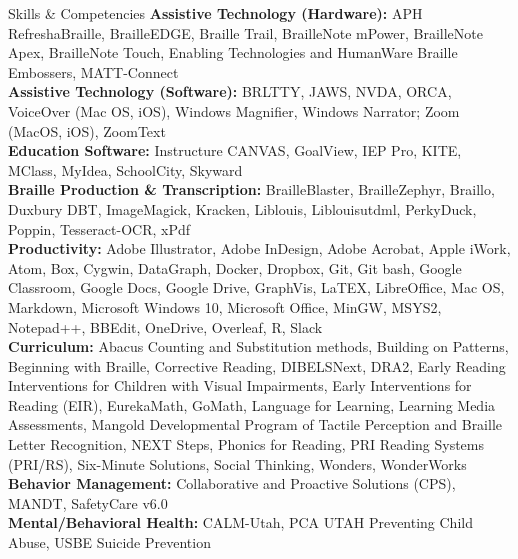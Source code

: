 \documentclass{resume} %
\begin{document}
\begin{rSection}{Skills \& Competencies}
	\textbf{Assistive Technology (Hardware):} APH RefreshaBraille, BrailleEDGE, Braille Trail, BrailleNote mPower, BrailleNote Apex, BrailleNote Touch, Enabling Technologies and HumanWare Braille Embossers, MATT-Connect \\[.5em]
	\textbf{Assistive Technology (Software):} BRLTTY, JAWS, NVDA, ORCA, VoiceOver (Mac OS, iOS), Windows Magnifier, Windows Narrator; Zoom (MacOS, iOS), ZoomText \\[.5em]
	\textbf{Education Software:}  Instructure CANVAS, GoalView, IEP Pro, KITE, MClass, MyIdea, SchoolCity, Skyward \\[.5em]
	\textbf{Braille Production \& Transcription:} BrailleBlaster, BrailleZephyr, Braillo, Duxbury DBT, ImageMagick, Kracken, Liblouis, Liblouisutdml, PerkyDuck, Poppin, Tesseract-OCR,  xPdf\\[.5em]
	\textbf{Productivity:} Adobe Illustrator, Adobe InDesign, Adobe Acrobat, Apple iWork, Atom, Box, Cygwin, DataGraph, Docker, Dropbox, Git, Git bash, Google Classroom, Google Docs, Google Drive, GraphVis, LaTEX, LibreOffice, Mac OS, Markdown, Microsoft Windows 10, Microsoft Office, MinGW, MSYS2, Notepad++, BBEdit, OneDrive, Overleaf, R, Slack\\[.5em]
	\textbf{Curriculum:} Abacus Counting and Substitution methods, Building on Patterns, Beginning with Braille, Corrective Reading, DIBELSNext, DRA2, Early Reading Interventions for Children with Visual Impairments, Early Interventions for Reading (EIR), EurekaMath, GoMath, Language for Learning, Learning Media Assessments, Mangold Developmental Program of Tactile Perception and Braille Letter Recognition, NEXT Steps, Phonics for Reading, PRI Reading Systems (PRI/RS), Six-Minute Solutions, Social Thinking, Wonders, WonderWorks   \\[0.5em]
	\textbf{Behavior Management:} Collaborative and Proactive Solutions (CPS), MANDT, SafetyCare v6.0 \\[0.5em]
	\textbf{Mental/Behavioral Health:} CALM-Utah, PCA UTAH Preventing Child Abuse, USBE Suicide Prevention
\end{rSection}
\end{document}
